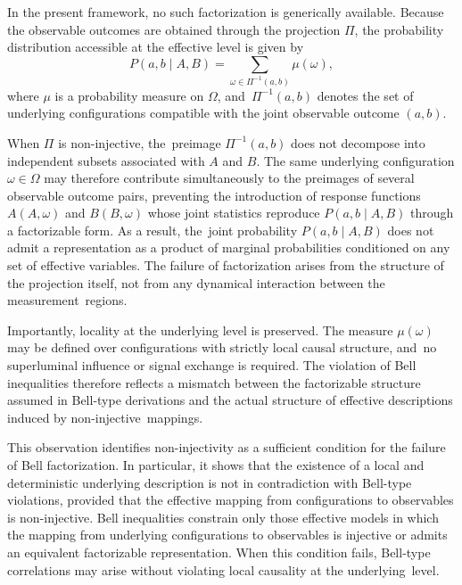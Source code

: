 \documentclass[quantumrep,article,accept,pdftex,oneauthor]{Definitions/mdpi}
\theoremstyle{remark}
\begin{document}
    In the present framework, no such factorization is generically available.
    Because the observable outcomes are obtained through the projection $\Pi$,
    the probability distribution accessible at the effective level is given by
\begin{equation}
      P(a,b \mid A,B) =
      \sum_{\omega \in \Pi^{-1}(a,b)}
      \mu(\omega),
    \end{equation}
    where $\mu$ is a probability measure on $\Omega$, and~$\Pi^{-1}(a,b)$ denotes the
    set of underlying configurations compatible with the joint observable outcome $(a,b)$.

    When $\Pi$ is non-injective, the~preimage $\Pi^{-1}(a,b)$ does not decompose into
    independent subsets associated with $A$ and $B$.
    The same underlying configuration $\omega \in \Omega$ may therefore
    contribute simultaneously to the preimages of several observable
    outcome pairs, preventing the introduction of response functions
    $A(A,\omega)$ and $B(B,\omega)$ whose joint statistics reproduce
    $P(a,b\mid A,B)$ through a factorizable form.
    As a result, the~joint probability $P(a,b \mid A,B)$ does not admit a representation
    as a product of marginal probabilities conditioned on any set of effective variables.
    The failure of factorization arises from the structure of the projection itself,
    not from any dynamical interaction between the measurement~regions.

    Importantly, locality at the underlying level is preserved.
    The measure $\mu(\omega)$ may be defined over configurations with strictly local
    causal structure, and~no superluminal influence or signal exchange is required.
    The violation of Bell inequalities therefore reflects a mismatch between the
    factorizable structure assumed in Bell-type derivations and the actual structure
    of effective descriptions induced by non-injective~mappings.

    This observation identifies non-injectivity as a sufficient condition for the
    failure of Bell factorization.
    In particular, it shows that the existence of a local and deterministic underlying
    description is not in contradiction with Bell-type violations, provided that the
    effective mapping from configurations to observables is non-injective.
    Bell inequalities constrain only those effective models in which the mapping
    from underlying configurations to observables is injective or admits an equivalent
    factorizable representation.
    When this condition fails, Bell-type correlations may arise without violating
    local causality at the underlying~level.
\end{document}
